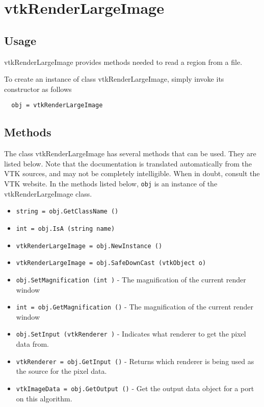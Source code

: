 \section{vtkRenderLargeImage}

\subsection{Usage}

 vtkRenderLargeImage provides methods needed to read a region from a file.

To create an instance of class vtkRenderLargeImage, simply
invoke its constructor as follows
\begin{verbatim}
  obj = vtkRenderLargeImage
\end{verbatim}
\subsection{Methods}

The class vtkRenderLargeImage has several methods that can be used.
  They are listed below.
Note that the documentation is translated automatically from the VTK sources,
and may not be completely intelligible.  When in doubt, consult the VTK website.
In the methods listed below, \verb|obj| is an instance of the vtkRenderLargeImage class.
\begin{itemize}
\item  \verb|string = obj.GetClassName ()|

\item  \verb|int = obj.IsA (string name)|

\item  \verb|vtkRenderLargeImage = obj.NewInstance ()|

\item  \verb|vtkRenderLargeImage = obj.SafeDownCast (vtkObject o)|

\item  \verb|obj.SetMagnification (int )| -  The magnification of the current render window

\item  \verb|int = obj.GetMagnification ()| -  The magnification of the current render window

\item  \verb|obj.SetInput (vtkRenderer )| -  Indicates what renderer to get the pixel data from.

\item  \verb|vtkRenderer = obj.GetInput ()| -  Returns which renderer is being used as the source for the pixel data.

\item  \verb|vtkImageData = obj.GetOutput ()| -  Get the output data object for a port on this algorithm.

\end{itemize}
